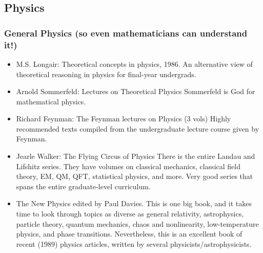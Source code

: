 \documentclass[10pt,a4paper]{book}
\theoremstyle{definition}
\begin{document}
\subsection{Physics}
\subsubsection{General Physics (so even mathematicians can understand it!)}

\begin{itemize}
\item M.S. Longair: Theoretical concepts in physics, 1986.
An alternative view of theoretical reasoning in physics for final-year undergrads.
\item Arnold Sommerfeld: Lectures on Theoretical Physics
Sommerfeld is God for mathematical physics.

\item Richard Feynman: The Feynman lectures on Physics (3 vols)
Highly recommended texts compiled from the undergraduate lecture course given by Feynman.

\item Jearle Walker: The Flying Circus of Physics
There is the entire Landau and Lifshitz series.  They have volumes on classical mechanics, classical field theory, EM, QM, QFT, statistical physics, and more.  Very good series that spans the entire graduate-level curriculum.

\item The New Physics edited by Paul Davies.
This is one big book, and it takes time to look through topics as diverse as general relativity, astrophysics, particle theory, quantum mechanics, chaos and nonlinearity, low-temperature physics, and phase transitions.  Nevertheless, this is an excellent book of recent (1989) physics articles, written by several physicists/astrophysicists.


\end{itemize}
\end{document}
